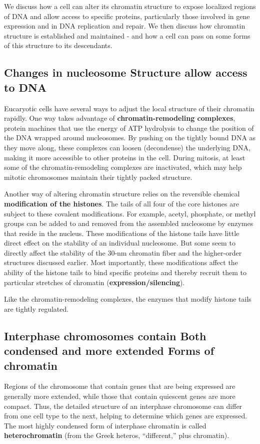 We discuss how a cell can alter its chromatin structure to
expose localized regions of DNA and allow access to specific proteins,
particularly those involved in gene expression and in DNA replication
and repair. We then discuss how chromatin structure is established and
maintained - and how a cell can pass on some forms of this structure
to its descendants.

\subsection{Changes in nucleosome Structure allow access to DNA}

Eucaryotic cells have several ways to adjust the local structure of their
chromatin rapidly. One way takes advantage of \textbf{chromatin-remodeling
complexes}, protein machines that use the energy of ATP hydrolysis to
change the position of the DNA wrapped around nucleosomes. By pushing
on the tightly bound DNA as they move along, these complexes can
loosen (decondense) the underlying DNA, making it more accessible to
other proteins in the cell. During mitosis, at least some of
the chromatin-remodeling complexes are inactivated, which may help
mitotic chromosomes maintain their tightly packed structure.

Another way of altering chromatin structure relies on the reversible chemical
\textbf{modification of the histones}. The tails of all four of the core histones
are subject to these covalent modifications. For example,
acetyl, phosphate, or methyl groups can be added to and removed from
the assembled nucleosome by enzymes that reside in the nucleus. These
modifications of the histone tails have little direct effect on the stability of
an individual nucleosome. But some seem to directly affect the stability
of the 30-nm chromatin fiber and the higher-order structures discussed
earlier.
Most importantly, these modifications affect the ability of the histone tails
to bind specific proteins and thereby recruit them to particular stretches
of chromatin (\textbf{expression/silencing}).

Like the chromatin-remodeling complexes, the enzymes that modify histone
tails are tightly regulated.

\subsection{Interphase chromosomes contain Both condensed and more extended Forms of chromatin}

Regions of the chromosome that contain
genes that are being expressed are generally more extended, while those
that contain quiescent genes are more compact. Thus, the detailed structure
of an interphase chromosome can differ from one cell type to the
next, helping to determine which genes are expressed.
The most highly condensed form of interphase chromatin is called \textbf{heterochromatin}
(from the Greek heteros, “different,” plus chromatin).


